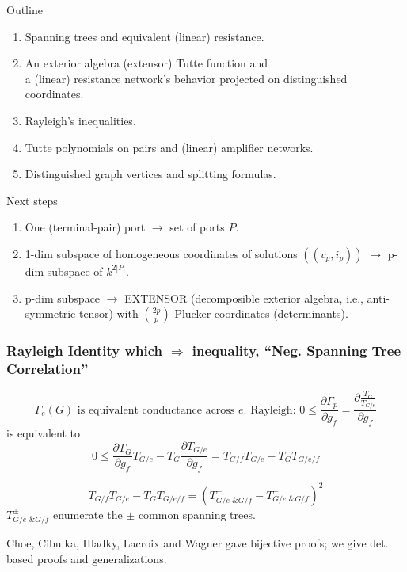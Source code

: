 \documentclass{beamer}
\begin{document}
\begin{frame}{Outline}
\begin{enumerate}
\item Spanning trees and equivalent (linear) resistance.
\item An exterior algebra (extensor) Tutte function and\\
 a (linear) resistance network's
behavior projected on distinguished coordinates.
\item Rayleigh's inequalities.
\item Tutte polynomials on pairs and (linear) amplifier networks.
\item Distinguished graph vertices and splitting formulas.
\end{enumerate}
\end{frame}


\begin{frame}{Next steps}
\begin{enumerate}
\item One (terminal-pair) port $\rightarrow$ set of ports $P$.
\item 1-dim subspace of homogeneous coordinates of solutions
$((v_p, i_p))$ $\rightarrow$ p-dim subspace of $k^{2|P|}$.
\item p-dim subspace $\rightarrow$ EXTENSOR (decomposible
exterior algebra, i.e., anti-symmetric tensor) with $\binom{2p}{p}$ Plucker
coordinates (determinants).
\end{enumerate}
\end{frame}



\begin{frame}
\frametitle{Rayleigh Identity which $\Rightarrow$ inequality, 
``Neg. Spanning Tree Correlation''}
\[
\Gamma_e(G)\text{ is equivalent conductance across }e.
\text{ Rayleigh: }0 \le \frac{\partial \Gamma_{p}}{\partial g_f} =
\frac{\partial \frac{T_G}{T_{G/e}}}{\partial g_f}
\]
is equivalent to 
\[
0 \le \frac{\partial T_G}{\partial g_f}T_{G/e} - 
       T_G\frac{\partial T_{G/e}}{\partial g_f} 
=
T_{G/f}T_{G/e} - T_GT_{G/e/f}
\]
\begin{theorem}
\[
T_{G/f}T_{G/e} - T_GT_{G/e/f} = \left( T^+_{G/e \text{ \& } G/f} - T^-_{G/e \text{ \& } G/f} \right)^2
\]
$T^{\pm}_{G/e \text{ \& } G/f}$ enumerate the $\pm$ common spanning trees.
\end{theorem}
Choe, Cibulka, Hladky, Lacroix and Wagner gave bijective proofs; 
we give det. based proofs and generalizations.
\end{frame}
\end{document}
